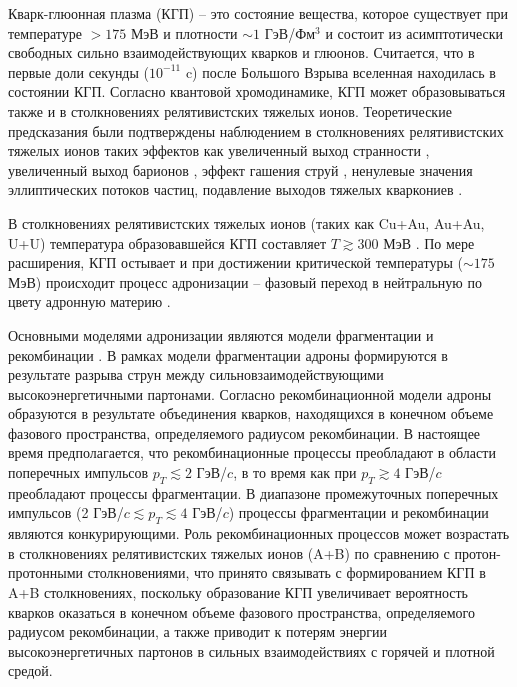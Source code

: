 {\actuality} Кварк-глюонная плазма (КГП) -- это состояние вещества, которое существует при температуре $>175$ МэВ и плотности $\sim1$ ГэВ/Фм$^3$ \autocite{firstQGP, firstQGPcern, QGP} и состоит из асимптотически свободных сильно взаимодействующих кварков и глюонов. Считается, что в первые доли секунды ($10^{-11}$ c) после Большого Взрыва вселенная находилась в состоянии КГП. Согласно квантовой хромодинамике, КГП может образовываться также и в столкновениях релятивистских тяжелых ионов. Теоретические предсказания \autocite{firstQGP} были подтверждены наблюдением в столкновениях релятивистских тяжелых ионов таких эффектов как увеличенный выход странности \autocite{StrangEnh, Strangeness_QGP}, увеличенный выход барионов \autocite{BaryonPuzzleHeavy,p2piRatio_2003,p2piRatio_130GeV}, эффект гашения струй \autocite{JetQuenching1, JetQuenching2, JetQuenching3}, ненулевые значения эллиптических потоков частиц, подавление выходов тяжелых кваркониев \autocite{quarkonia_melting, quarkonium_suppression}. 


В столкновениях релятивистских тяжелых ионов (таких как Cu+Au, Au+Au, U+U) температура образовавшейся КГП составляет $T\gtrsim300$ МэВ \autocite{Coalescence_models}. По мере расширения, КГП остывает и при достижении критической температуры ($\sim175$ МэВ) происходит процесс адронизации \cite{QGP, QGP, Coalescence_models} -- фазовый переход в нейтральную по цвету адронную материю \autocite{nucleus2020}. 

Основными моделями адронизации являются модели фрагментации \cite{FragmentationLund} и рекомбинации \autocite{Coalescence_models, Recombination1, Recombination2}. В рамках модели фрагментации адроны формируются в результате разрыва струн между сильновзаимодействующими высокоэнергетичными партонами.
Согласно рекомбинационной модели адроны образуются в результате объединения кварков, находящихся в конечном объеме фазового пространства, определяемого радиусом рекомбинации. 
В настоящее время предполагается, что рекомбинационные процессы преобладают в области поперечных импульсов $p_T \lesssim 2$ ГэВ/$c$, в то время как при $p_T \gtrsim 4$ ГэВ/$c$ преобладают
процессы фрагментации. В диапазоне промежуточных поперечных импульсов (2 ГэВ/$c \lesssim p_T \lesssim 4$ ГэВ/$c$) процессы фрагментации и рекомбинации являются конкурирующими.
Роль рекомбинационных процессов может возрастать в столкновениях релятивистских тяжелых ионов (A+B) по сравнению с протон-протонными столкновениями, что принято связывать \cite{Recombination1, Recombination2, BaryonPuzzleHeavy} с формированием КГП в A+B столкновениях, поскольку
образование КГП увеличивает вероятность кварков оказаться в конечном объеме фазового пространства, определяемого радиусом рекомбинации, а также приводит к потерям энергии высокоэнергетичных партонов в сильных взаимодействиях с горячей и плотной средой.

